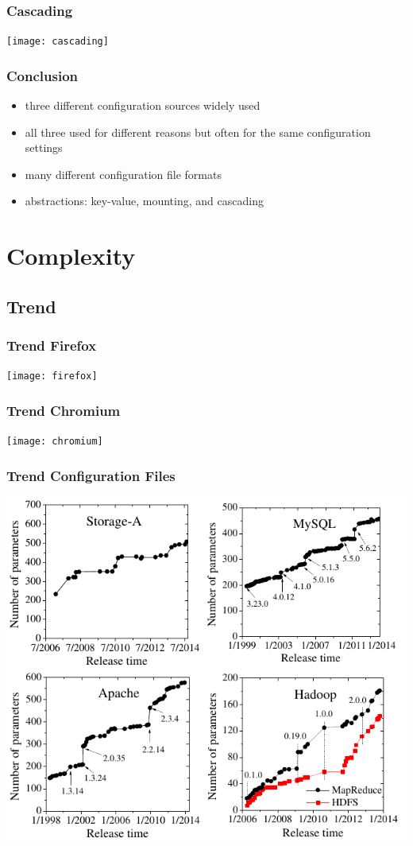 \begin{frame}
	\frametitle{Cascading}
	\texttt{[image: cascading]}
\end{frame}


\begin{frame}
	\frametitle{Conclusion}
	\begin{itemize}
	\item three different configuration sources widely used
	\item all three used for different reasons but often for the same configuration settings
	\item many different configuration file formats
	\item abstractions: key-value, mounting, and cascading
	\end{itemize}
\end{frame}





\section{Complexity}

\subsection{Trend}

\begin{frame}
	\frametitle{Trend Firefox}
	\texttt{[image: firefox]}
\end{frame}

\begin{frame}
	\frametitle{Trend Chromium}
	\texttt{[image: chromium]}
\end{frame}

\begin{frame}
	\frametitle{Trend Configuration Files}
	\includegraphics[scale=0.5]{pics/trend.png}
	\citet{xu2015hey}
\end{frame}


